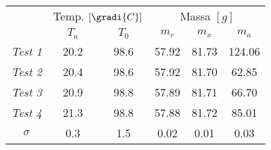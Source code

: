 \begin{tabular}{cccccc}
\toprule
 & \multicolumn{2}{c}{Temp. $[\gradi{C}]$} & \multicolumn{3}{c}{Massa $[g]$} \\
  \cmidrule(lr){2-3}  \cmidrule(lr){4-6}
 & $T_a$ & $T_0$ & $m_r$ & $m_x$ & $m_a$ \\ \midrule
\emph{Test 1} & 20.2 & 98.6 & 57.92 & 81.73 & 124.06 \\ \midrule
\emph{Test 2} & 20.4 & 98.6 & 57.92 & 81.70 & 62.85 \\ \midrule
\emph{Test 3} & 20.9 & 98.8 & 57.89 & 81.71 & 66.70 \\ \midrule
\emph{Test 4} & 21.3 & 98.8 & 57.88 & 81.72 & 85.01 \\ \midrule
$\sigma$ & 0.3 & 1.5 & 0.02 & 0.01 & 0.03 \\ \bottomrule
\end{tabular}
